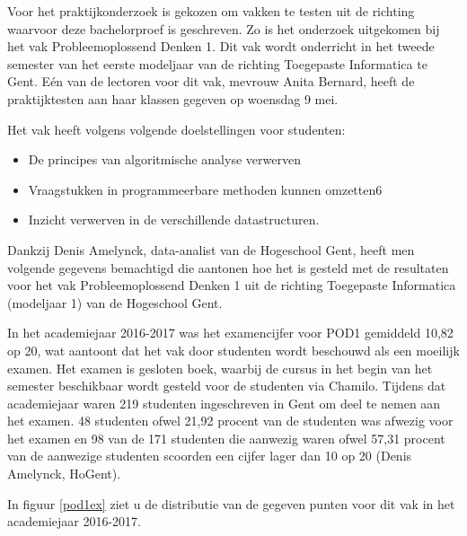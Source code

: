 Voor het praktijkonderzoek is gekozen om vakken te testen uit de richting waarvoor deze bachelorproef is geschreven. Zo is het onderzoek uitgekomen bij het vak Probleemoplossend Denken 1. Dit vak wordt onderricht in het tweede semester van het eerste modeljaar van de richting Toegepaste Informatica te Gent. Eén van de lectoren voor dit vak, mevrouw Anita Bernard, heeft de praktijktesten aan haar klassen gegeven op woensdag 9 mei. 

Het vak heeft volgens \textcite{Studiegids2017} volgende doelstellingen voor studenten:
\begin{itemize}
	\item De principes van algoritmische analyse verwerven
	\item Vraagstukken in programmeerbare methoden kunnen omzetten6
	\item Inzicht verwerven in de verschillende datastructuren.
\end{itemize}

Dankzij Denis Amelynck, data-analist van de Hogeschool Gent, heeft men volgende gegevens bemachtigd die aantonen hoe het is gesteld met de resultaten voor het vak Probleemoplossend Denken 1 uit de richting Toegepaste Informatica (modeljaar 1) van de Hogeschool Gent.

In het academiejaar 2016-2017 was het examencijfer voor POD1 gemiddeld 10,82 op 20, wat aantoont dat het vak door studenten wordt beschouwd als een moeilijk examen. Het examen is gesloten boek, waarbij de cursus in het begin van het semester beschikbaar wordt gesteld voor de studenten via Chamilo. Tijdens dat academiejaar waren 219 studenten ingeschreven in Gent om deel te nemen aan het examen. 48 studenten ofwel 21,92 procent van de studenten was afwezig voor het examen en 98 van de 171 studenten die aanwezig waren ofwel 57,31 procent van de aanwezige studenten scoorden een cijfer lager dan 10 op 20 (Denis Amelynck, HoGent).

In figuur \ref{pod1ex} ziet u de distributie van de gegeven punten voor dit vak in het academiejaar 2016-2017.

